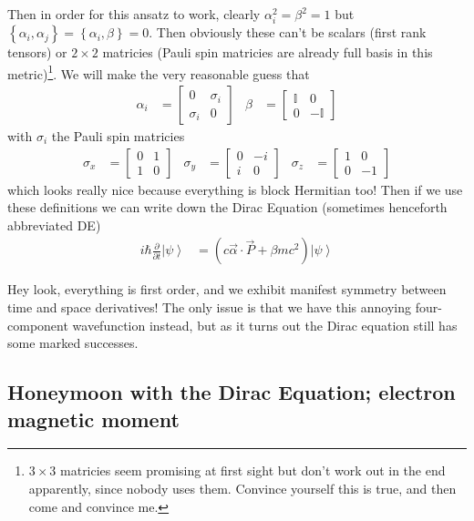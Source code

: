 \documentclass[12pt]{article}
\newcommand{\ket}[1]{\left|#1\right>}
\newcommand{\pd}[2]{\frac{\partial#1}{\partial#2}}
\begin{document}
Then in order for this ansatz to work, clearly $\alpha_i^2 = \beta^2 = 1$ but $\left\{ \alpha_i, \alpha_j \right\} = \left\{ \alpha_i, \beta \right\} = 0$. Then obviously these can't be scalars (first rank tensors) or $2\times2$ matricies (Pauli spin matricies are already full basis in this metric)\footnote{$3\times3$ matricies seem promising at first sight but don't work out in the end apparently, since nobody uses them. Convince yourself this is true, and then come and convince me.}. We will make the very reasonable guess that 
\begin{align}
    \alpha_i &= \begin{bmatrix} 0 & \sigma_i \\ \sigma_i & 0 \end{bmatrix} & \beta &= \begin{bmatrix} \mathbb{I} &0 \\ 0 & -\mathbb{I} \end{bmatrix} 
\end{align}
with $\sigma_i$ the Pauli spin matricies
\begin{align}
    \sigma_x &= \begin{bmatrix} 0 & 1\\1 & 0 \end{bmatrix} & \sigma_y &= \begin{bmatrix} 0 & -i\\i & 0 \end{bmatrix}  & \sigma_z &= \begin{bmatrix} 1 & 0\\0 & -1 \end{bmatrix} 
\end{align}
which looks really nice because everything is block Hermitian too! Then if we use these definitions we can write down the Dirac Equation (sometimes henceforth abbreviated DE)
\begin{align}
    i\hbar \pd{}{t}\ket{\psi} &= \left( c\vec{\alpha} \cdot \vec{P} + \beta mc^2 \right)\ket{\psi}
\end{align}

Hey look, everything is first order, and we exhibit manifest symmetry between time and space derivatives! The only issue is that we have this annoying four-component wavefunction instead, but as it turns out the Dirac equation still has some marked successes. 

\subsection{Honeymoon with the Dirac Equation; electron magnetic moment}
\end{document}
